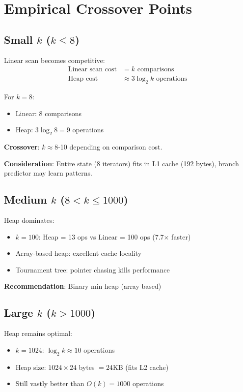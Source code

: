 \documentclass[11pt]{article}
\begin{document}
\section{Empirical Crossover Points}

\subsection{Small $k$ ($k \leq 8$)}

Linear scan becomes competitive:
\begin{align*}
\text{Linear scan cost} &= k \text{ comparisons} \\
\text{Heap cost} &\approx 3 \log_2 k \text{ operations}
\end{align*}

For $k = 8$:
\begin{itemize}
    \item Linear: 8 comparisons
    \item Heap: $3 \log_2 8 = 9$ operations
\end{itemize}

\textbf{Crossover}: $k \approx 8$-10 depending on comparison cost.

\textbf{Consideration}: Entire state (8 iterators) fits in L1 cache (192 bytes), branch predictor may learn patterns.

\subsection{Medium $k$ ($8 < k \leq 1000$)}

Heap dominates:
\begin{itemize}
    \item $k = 100$: Heap = 13 ops vs Linear = 100 ops (7.7$\times$ faster)
    \item Array-based heap: excellent cache locality
    \item Tournament tree: pointer chasing kills performance
\end{itemize}

\textbf{Recommendation}: Binary min-heap (array-based)

\subsection{Large $k$ ($k > 1000$)}

Heap remains optimal:
\begin{itemize}
    \item $k = 1024$: $\log_2 k \approx 10$ operations
    \item Heap size: $1024 \times 24$ bytes $= 24$KB (fits L2 cache)
    \item Still vastly better than $O(k) = 1000$ operations
\end{itemize}
\end{document}

